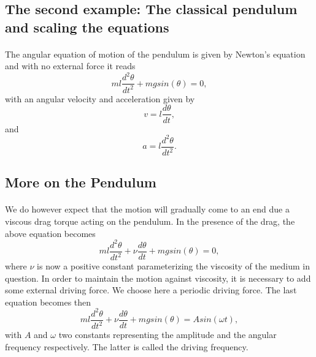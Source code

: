 \documentclass[%
oneside,                 %
final,                   %
10pt]{article}
\begin{document}
\subsection*{The second example: The classical pendulum and scaling the equations}

\paragraph{}
The angular equation of motion of the pendulum is given by
Newton's equation and with no external force it reads 
\begin{equation}
  ml\frac{d^2\theta}{dt^2}+mgsin(\theta)=0,
\end{equation}
with an angular velocity and acceleration given by
\begin{equation}
     v=l\frac{d\theta}{dt},
\end{equation}
and 
\begin{equation}
     a=l\frac{d^2\theta}{dt^2}.
\end{equation}



\subsection*{More on the Pendulum}

\paragraph{}
We do however expect that the motion will gradually come to an end due a viscous drag torque acting on the pendulum. 
In the presence of the drag, the above equation becomes
\begin{equation}
   ml\frac{d^2\theta}{dt^2}+\nu\frac{d\theta}{dt}  +mgsin(\theta)=0, \label{eq:pend1}
\end{equation}
where $\nu$ is now a positive constant parameterizing the viscosity
of the medium in question. In order to maintain the motion against
viscosity, it is necessary to add some external driving force. 
We choose here a periodic driving force. The last equation becomes then
\begin{equation}
   ml\frac{d^2\theta}{dt^2}+\nu\frac{d\theta}{dt}  +mgsin(\theta)=Asin(\omega t), \label{eq:pend2}
\end{equation}
with $A$ and $\omega$ two constants representing the amplitude and 
the angular frequency respectively. The latter is called the driving frequency.
\end{document}
